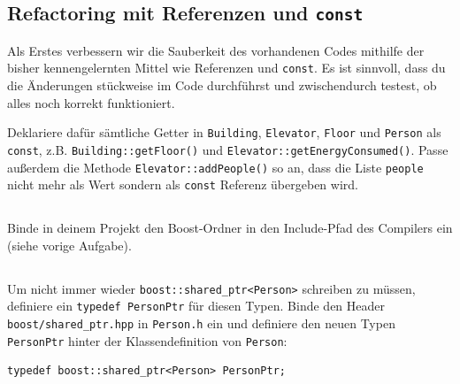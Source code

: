 
\subsection{Refactoring mit Referenzen und \texttt{const}}
Als Erstes verbessern wir die Sauberkeit des vorhandenen Codes mithilfe der bisher kennengelernten Mittel wie Referenzen und \texttt{const}.
Es ist sinnvoll, dass du die Änderungen stückweise im Code durchführst und zwischendurch testest, ob alles noch korrekt funktioniert.

Deklariere dafür sämtliche Getter in \texttt{Building}, \texttt{Elevator}, \texttt{Floor} und \texttt{Person} als \texttt{const}, z.B. \texttt{Building::getFloor()} und \texttt{Elevator::getEnergyConsumed()}.
Passe außerdem die Methode \texttt{Elevator::addPeople()} so an, dass die Liste \texttt{people} nicht mehr als Wert sondern als \texttt{const} Referenz übergeben wird.


\subsection{}
Binde in deinem Projekt den Boost-Ordner in den Include-Pfad des Compilers ein (siehe vorige Aufgabe).

\subsection{}
Um nicht immer wieder \texttt{boost::shared\_ptr<Person>} schreiben zu müssen, definiere ein \texttt{typedef PersonPtr} für diesen Typen.
Binde den Header \texttt{boost/shared\_ptr.hpp} in \texttt{Person.h} ein und definiere den neuen Typen \texttt{PersonPtr} hinter der Klassendefinition von \texttt{Person}:

\begin{lstlisting}
typedef boost::shared_ptr<Person> PersonPtr;
\end{lstlisting}


